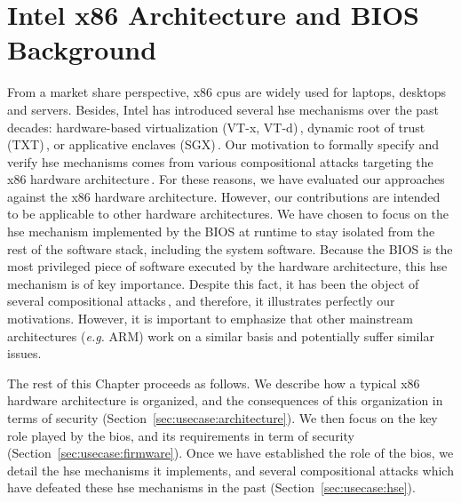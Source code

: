 \chapter{Intel x86 Architecture and BIOS Background}
\label{chapter:usecase}



\vspace{1cm}\noindent From a market share perspective, x86 \acp{cpu} are widely
used for laptops, desktops and servers.
%
Besides, Intel has introduced several \ac{hse} mechanisms over the past decades:
hardware-based virtualization (VT-x, VT-d)\,\cite[Volume 3, Chapter
23]{intel2014manual}, dynamic root of trust (TXT)\,\cite{intel2015txt}, or
applicative enclaves (SGX)\,\cite[Volume 3, Chapter
36]{intel2014manual}\cite{costan2016sgxexplained}.
%
Our motivation to formally specify and verify \ac{hse} mechanisms comes from
various compositional attacks targeting the x86 hardware
architecture\,\cite{duflot2009smram,wojtczuk2009smram,kallenberg2015racecondition,domas2015sinkhole,kovah2015senter}.
%
For these reasons, we have evaluated our approaches against the x86 hardware
architecture.
%
However, our contributions are intended to be applicable to other hardware
architectures.
%
We have chosen to focus on the \ac{hse} mechanism implemented by the BIOS at
runtime to stay isolated from the rest of the software stack, including the
system software.
%
Because the BIOS is the most privileged piece of software executed by the
hardware architecture, this \ac{hse} mechanism is of key importance.
%
Despite this fact, it has been the object of several compositional
attacks\,\cite{duflot2009smram,wojtczuk2009smram,domas2015sinkhole}, and
therefore, it illustrates perfectly our motivations.
%
However, it is important to emphasize that other mainstream architectures
(\emph{e.g.}  ARM) work on a similar basis and potentially suffer similar
issues.

The rest of this Chapter proceeds as follows.
%
We describe how a typical x86 hardware architecture is organized, and the
consequences of this organization in terms of security
(Section~\ref{sec:usecase:architecture}).
%
We then focus on the key role played by the \ac{bios}, and its requirements in
term of security (Section~\ref{sec:usecase:firmware}).
%
Once we have established the role of the \ac{bios}, we detail the \ac{hse}
mechanisms it implements, and several compositional attacks which have defeated
these \ac{hse} mechanisms in the past (Section~\ref{sec:usecase:hse}).

